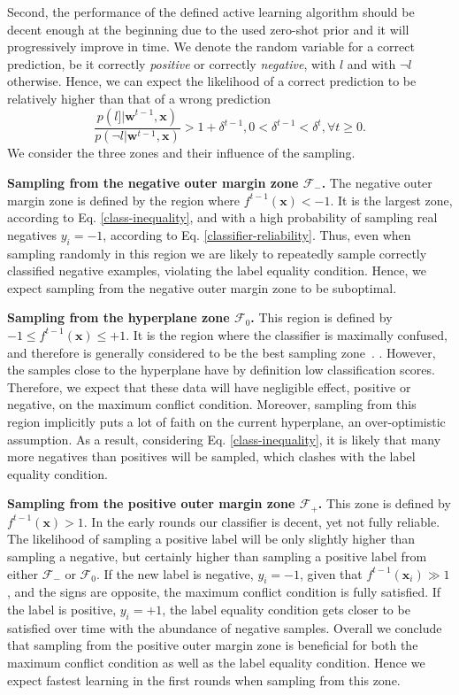 \documentclass[10pt,twocolumn,letterpaper]{article}
\newcommand{\mb}[1]{\bm #1}
\newcommand{\eqr}[1]{Eq. \eqref{#1}}
\begin{document}
Second, the performance of the defined active learning algorithm should be decent enough at the beginning due to the used zero-shot prior and it will progressively improve in time. 
We denote the random variable for a correct prediction, be it correctly \emph{positive} or correctly \emph{negative}, with $l$ and with $\neg l$ otherwise. 
Hence, we can expect the likelihood of a correct prediction to  be relatively higher than that of a wrong prediction
\begin{equation}
\frac{p(l]| \mb{w}^{t-1}, \mb{x})}{p(\neg l|\mb{w}^{t-1}, \mb{x})} > 1+\delta^{t-1}, 0 < \delta^{t-1} < \delta^{t}, \forall t\geq0.
\label{classifier-reliability}
\end{equation}
We consider the three zones and their influence of the sampling.

\textbf{Sampling from the negative outer margin zone $\mathcal{F}_-$.} 
The negative outer margin zone is defined by the region where $f^{t-1}(\mb{x}) < -1$. %
It is the largest zone,  according to \eqr{class-inequality}, and with a high probability of sampling real negatives $y_i=-1$, according to \eqr{classifier-reliability}.
Thus, even when sampling randomly in this region we are likely to repeatedly sample correctly classified negative examples, violating the label equality condition. Hence, we expect sampling from the negative outer margin zone to be suboptimal.

\textbf{Sampling from the hyperplane zone $\mathcal{F}_0$.} This region is defined by $-1 \leq f^{t-1}(\mb{x})  \leq +1$. It is the region where the classifier is maximally confused, and therefore is generally considered to be the best sampling zone~\cite{Schohn, Vijayanarasimhan2011}.
.
However, the samples close to the hyperplane have by definition low classification scores. Therefore, we expect that these data will have negligible effect, positive or negative, on the maximum conflict condition. Moreover, sampling from this region implicitly puts a lot of faith on the current hyperplane, an over-optimistic assumption. As a result, considering \eqr{class-inequality}, it is likely that many more negatives than positives will be sampled, which clashes with the label equality condition.

\textbf{Sampling from the positive outer margin zone $\mathcal{F}_+$.} This zone is defined by $f^{t-1}(\mb{x}) > 1$. 
In the early rounds our classifier is decent, yet not fully reliable. The likelihood of sampling a positive label will be only slightly higher than sampling a negative, but certainly higher than sampling a positive label from either $\mathcal{F}_-$ or $\mathcal{F}_0$.
If the new label is negative, $y_i=-1$, given that $f^{t-1}(\mb{x}_i) \gg 1$, and the signs are opposite, the maximum 
conflict condition is fully satisfied. If the label is positive, $y_i=+1$, the label equality condition gets closer to be satisfied over time with the abundance of negative samples.
Overall we conclude that sampling from the positive outer margin zone is beneficial for both the maximum conflict condition as well as the label equality condition. Hence we expect fastest learning in the first rounds when sampling from this zone.
\end{document}
